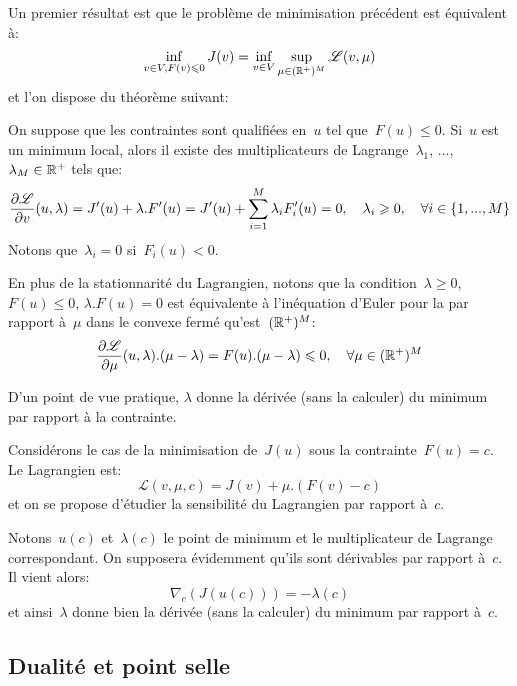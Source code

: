 \medskip
Un premier résultat est que le problème de minimisation précédent est équivalent à:
\begin{equation}
\inf_{v\in V, F(v)\leqslant0} J(v) = \inf_{v\in V} \sup_{\mu\in(\mathbb R^+)^M} \mathscr{L}(v,\mu)
\end{equation}
et l'on dispose du théorème suivant:
\begin{theoreme}
On suppose que les contraintes sont qualifiées en~$u$ tel que~$F(u)\le0$. Si~$u$ est un minimum local, alors il existe des multiplicateurs de Lagrange~$\lambda_1$, ..., $\lambda_M\in\mathbb R^+$ tels que:
\begin{equation}
\dfrac{\partial\mathscr{L}}{\partial v}(u,\lambda) = J'(u)+\lambda.F'(u)
= J'(u)+\displaystyle\sum_{i=1}^M\lambda_iF_i'(u) =0, \quad \lambda_i\geqslant0, 
\quad \forall i\in\{1, ..., M\}
\end{equation}
Notons que~$\lambda_i=0$ si~$F_i(u)<0$.

En plus de la stationnarité du Lagrangien, notons que la condition~$\lambda\ge0$, $F(u)\le 0$, $\lambda.F(u)=0$ est équivalente à l'inéquation d'Euler pour la  par rapport à~$\mu$ dans le convexe fermé qu'est~$(\mathbb R^+)^M$:
\begin{equation}
\dfrac{\partial\mathscr{L}}{\partial \mu}(u,\lambda).(\mu-\lambda)=F(u).(\mu-\lambda)\leqslant0, \quad \forall\mu\in(\mathbb R^+)^M
\end{equation}
\end{theoreme}

D'un point de vue pratique, $\lambda$ donne la dérivée (sans la calculer) du minimum par rapport à la contrainte.
\begin{demonstration}[Illustration]
Considérons le cas de la minimisation de~$J(u)$ sous la contrainte~$F(u)=c$.
Le Lagrangien est:
\[ \mathscr{L}(v,\mu,c)=J(v)+\mu.(F(v)-c) \]
et on se propose d'étudier la sensibilité du Lagrangien par rapport à~$c$.

Notons~$u(c)$ et~$\lambda(c)$ le point de minimum et le multiplicateur de Lagrange correspondant. On supposera évidemment qu'ils sont dérivables par rapport à~$c$. Il vient alors:
\[ \nabla_c\left(J(u(c))\right)=-\lambda(c) \]
et ainsi~$\lambda$ donne bien la dérivée (sans la calculer) du minimum par rapport à~$c$.
\end{demonstration}


\medskip
\subsection{Dualité et point selle}

